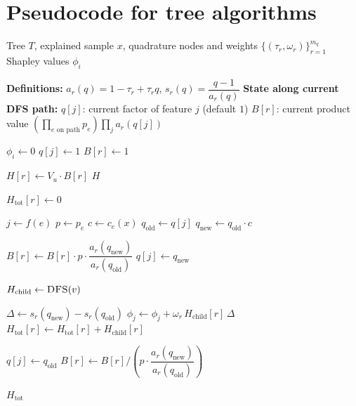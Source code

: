 \section{Pseudocode for tree algorithms}
\label{app:tree_algorithms}

\begin{algorithm}[t]
\caption{Optimal DFS algorithm}
\label{alg:optimal_dfs}
\begin{algorithmic}[1]
\Require Tree $T$, explained sample $x$, quadrature nodes and weights $\{(\tau_r,\omega_r)\}_{r=1}^{m_q}$
\Ensure Shapley values $\phi_i$

\Statex \textbf{Definitions:} $a_r(q)=1-\tau_r+\tau_r q$, \quad $s_r(q)=\dfrac{q-1}{a_r(q)}$
\Statex \textbf{State along current DFS path:}
\Statex \hspace{\algorithmicindent} $q[j]$: current factor of feature $j$ (default $1$)
\Statex \hspace{\algorithmicindent} $B[r]$: current product value $\left(\prod_{e\text{ on path}} p_e\right)\prod_j a_r(q[j])$

    \State $\phi_i \gets 0$
\EndFor
{}
    \State $q[j] \gets 1$
\EndFor
{}
    \State $B[r] \gets 1$
\EndFor

            \State $H[r] \gets V_u \cdot B[r]$
        \EndFor
        \State \Return $H$
    \EndIf

        \State $H_{\mathrm{tot}}[r] \gets 0$
    \EndFor

        \State $j \gets f(e)$
        \State $p \gets p_e$
        \State $c \gets c_e(x)$
        \State $q_{\mathrm{old}} \gets q[j]$
        \State $q_{\mathrm{new}} \gets q_{\mathrm{old}} \cdot c$

            \State $B[r] \gets B[r] \cdot p \cdot \dfrac{a_r(q_{\mathrm{new}})}{a_r(q_{\mathrm{old}})}$
        \EndFor
        \State $q[j] \gets q_{\mathrm{new}}$

        \State $H_{\mathrm{child}} \gets \Call{DFS}{v}$

            \State $\Delta \gets s_r(q_{\mathrm{new}}) - s_r(q_{\mathrm{old}})$
            \State $\phi_j \gets \phi_j + \omega_r \, H_{\mathrm{child}}[r] \, \Delta$
            \State $H_{\mathrm{tot}}[r] \gets H_{\mathrm{tot}}[r] + H_{\mathrm{child}}[r]$
        \EndFor

        \State $q[j] \gets q_{\mathrm{old}}$
            \State $B[r] \gets B[r] \big/ \left(p \cdot \dfrac{a_r(q_{\mathrm{new}})}{a_r(q_{\mathrm{old}})}\right)$
        \EndFor
    \EndFor

    \State \Return $H_{\mathrm{tot}}$
\EndFunction

\State {}
\end{algorithmic}
\end{algorithm}

